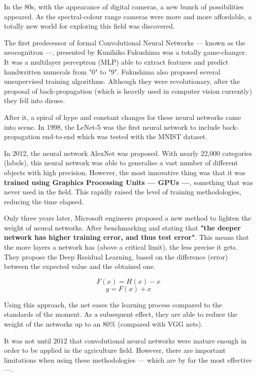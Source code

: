 \documentclass[12pt]{report} %
\begin{document}
In the 80s, with the appearance of digital cameras, a new bunch of possibilities appeared. As the spectral-colour range cameras were more and more affordable, a totally new world for exploring this field was discovered.

The first predecessor of formal Convolutional Neural Networks --- known as the neocognitron ---, presented by Kunihiko Fukushima was a totally game-changer. It was a multilayer perceptron (MLP) able to extract features and predict handwritten numerals from "0" to "9"\cite{FUKUSHIMA1988119}. Fukushima also proposed several unsupervised training algorithms. Although they were revolutionary, after the proposal of back-propagation \cite{ACKLEY1985147} (which is heavily used in computer vision currently) they fell into disuse.

After it, a spiral of hype and constant changes for these neural networks came into scene. In 1998, the LeNet-5\cite{Lecun98} was the first neural network to include back-propagation end-to-end which was tested with the MNIST dataset.

In 2012, the neural network AlexNet was proposed. With nearly 22,000 categories (labels), this neural network was able to generalise a vast number of different objects with high precision. However, the most innovative thing was that it was \textbf{trained using Graphics Processing Units --- GPUs ---}\cite{Alex2012}, something that was never used in the field. This rapidly raised the level of training methodologies, reducing the time elapsed.

Only three years later, Microsoft engineers proposed a new method to lighten the weight of neural networks. After benchmarking and stating that \textbf{"the deeper network has higher training error, and thus test error"}\cite{Kaiming2015}. This means that the more layers a network has (above a critical limit), the less precise it gets. They propose the Deep Residual Learning, based on the difference (error) between the expected value and the obtained one.

$$F(x) = H(x) - x$$
$$y = F(x) + x$$

Using this approach, the net eases the learning process compared to the standards of the moment. As a subsequent effect, they are able to reduce the weight of the networks up to an 80\% (compared with VGG nets).

It was not until 2012 that convolutional neural networks were mature enough in order to be applied in the agriculture field. However, there are important limitations when using these methodologies --- which are by far the most effective---.
\end{document}
